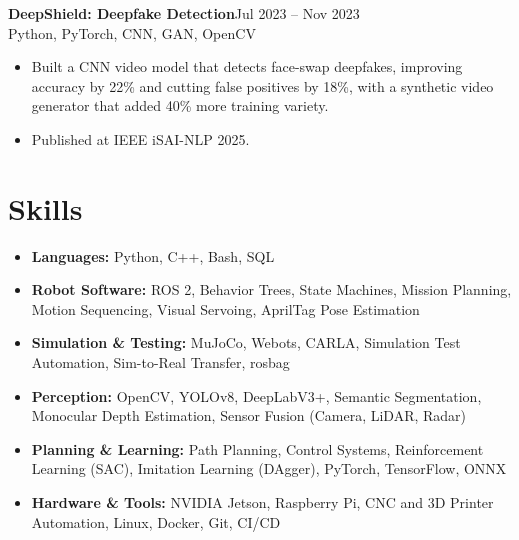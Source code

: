 \documentclass[a4paper,10pt]{article}
\newcommand{\project}[3]{\textbf{#1}\hfill #2\\{\small #3}\par\vspace{-2pt}}
\begin{document}
\project{DeepShield: Deepfake Detection}{Jul 2023 -- Nov 2023}{Python, PyTorch, CNN, GAN, OpenCV}
\begin{itemize}
  \item Built a CNN video model that detects face-swap deepfakes, improving accuracy by 22\% and cutting false positives by 18\%, with a synthetic video generator that added 40\% more training variety.
  \item Published at IEEE iSAI-NLP 2025.
\end{itemize}

\section{Skills}
\begin{itemize}
  \item \textbf{Languages:} Python, C++, Bash, SQL
  \item \textbf{Robot Software:} ROS 2, Behavior Trees, State Machines, Mission Planning, Motion Sequencing, Visual Servoing, AprilTag Pose Estimation
  \item \textbf{Simulation \& Testing:} MuJoCo, Webots, CARLA, Simulation Test Automation, Sim-to-Real Transfer, rosbag
  \item \textbf{Perception:} OpenCV, YOLOv8, DeepLabV3+, Semantic Segmentation, Monocular Depth Estimation, Sensor Fusion (Camera, LiDAR, Radar)
  \item \textbf{Planning \& Learning:} Path Planning, Control Systems, Reinforcement Learning (SAC), Imitation Learning (DAgger), PyTorch, TensorFlow, ONNX
  \item \textbf{Hardware \& Tools:} NVIDIA Jetson, Raspberry Pi, CNC and 3D Printer Automation, Linux, Docker, Git, CI/CD
\end{itemize}

\end{document}

